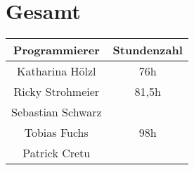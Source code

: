 \section{Gesamt}
\begin{center}
	\begin{tabular}{|c|c|}
		\hline \textbf{Programmierer} & \textbf{Stundenzahl} \\ 
		\hline Katharina Hölzl  &  76h\\ 
		\hline Ricky Strohmeier & 81,5h \\ 
		\hline Sebastian Schwarz &  \\ 
		\hline Tobias Fuchs &  98h\\ 
		\hline Patrick Cretu &  \\ 
		\hline 
	\end{tabular}
\end{center} 